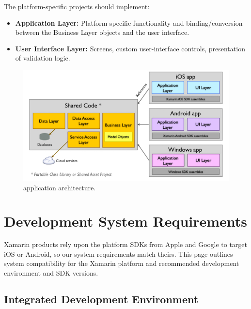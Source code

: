 The platform-specific projects should implement:
\begin{itemize}

\item \textbf{ Application Layer:} Platform specific functionality and binding/conversion between the Business Layer objects and the user interface.
\item \textbf{ User Interface Layer:} Screens, custom user-interface controls, presentation of validation logic.
\end{itemize}

\begin{figure}[th]
\centering
\includegraphics[width=\textwidth] {Figures/Xamarin_architecture}

\caption[architecture]{application architecture.}
\label{fig:architecture}
\end{figure}




\section{Development System Requirements }

Xamarin products rely upon the platform SDKs from Apple and Google to target iOS or Android, so our system requirements match theirs.
This page outlines system compatibility for the Xamarin platform and recommended development environment and SDK versions.


\subsection{Integrated Development Environment}

